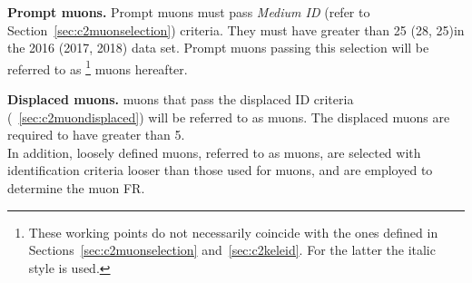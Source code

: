 \textbf {Prompt muons.}
Prompt muons must pass \emph{Medium ID} (refer
to Section~\ref{sec:c2muonselection}) criteria. They must have \pt greater than
25 (28, 25)\GeV in the 2016 (2017, 2018) data set.
Prompt muons passing this selection will be referred to as \tP\footnote{
These working points do not necessarily coincide with the ones
defined in Sections~\ref{sec:c2muonselection}
and~\ref{sec:c2keleid}. For the latter the italic style is used.} muons hereafter.

\textbf {Displaced muons.}
\Displ muons that pass the displaced ID criteria
(~\ref{sec:c2muondisplaced}) will be referred to as \tD
muons. The displaced muons are required to have \pt greater than 5\GeV.\\
In addition, loosely defined muons, referred to as \fo muons, are selected
with identification criteria looser than those used for \tD muons, and are employed to determine the muon FR.

\begin{table}[h!]
  \centering
{\small
  \caption{\label{tab:muonSelection} Requirements for a muon
    to pass each of the defined selection working points. Variables
    defined in Section~\ref{sec:c2variables}.}
    }
\end{table}



